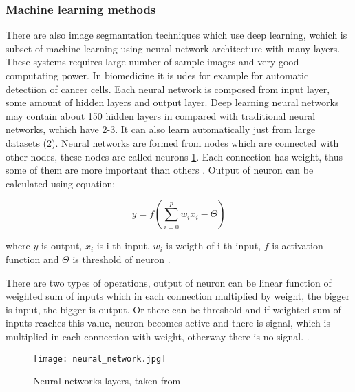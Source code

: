 \subsubsection{Machine learning methods}

        There are also image segmantation techniques which use deep learning, wchich is subset of machine learning using neural network architecture with many layers.
        These systems requires large number of sample images and very good computating power. In biomedicine it is udes for example for automatic detectiion of cancer cells.
        Each neural network is composed from input layer, some amount of hidden layers and output layer. Deep learning neural networks may contain about 150 hidden layers
        in compared with traditional neural networks, wchich have 2-3. It can also learn automatically just from large datasets (2). Neural networks are formed from
        nodes which are connected with other nodes, these nodes are called neurons \ref{fig:neural_networks}. Each connection has weight, thus some of them are more important than others \cite{29}.
        Output of neuron can be calculated using equation:

        \begin{equation}
            y = f(\sum_{i=0}^{p} w_i x_i - \Theta)
        \end{equation}

        where \(y\) is output, \(x_i\) is i-th input, \(w_i\) is weigth of i-th input, \(f\) is activation function and \(\Theta\) is threshold of neuron \cite{29}.

        There are two types of operations, output of neuron can be linear function of weighted sum of inputs which in each connection multiplied by weight, the bigger is input,
        the bigger is output. Or there can be threshold and if weighted sum of inputs reaches this value, neuron becomes active and there is signal, which is multiplied in each
        connection with weight, otherway there is no signal. \cite{29}.

        \begin{figure}[h]
            \texttt{[image: neural\_network.jpg]}
            \caption{Neural networks layers, taken from \cite{20}}
            \label{fig:neural_networks}
        \end{figure}

